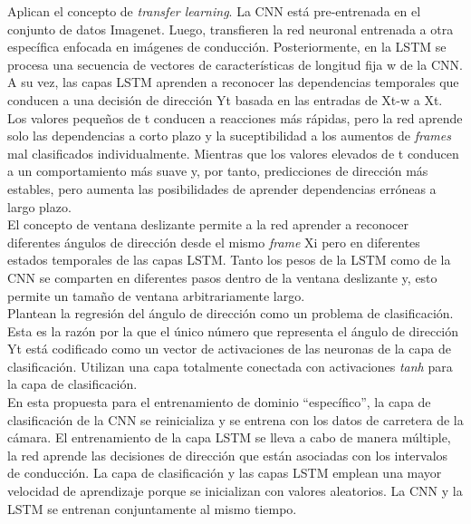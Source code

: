 Aplican el concepto de \textit{transfer learning}. La CNN está pre-entrenada en el conjunto de datos Imagenet. Luego, transfieren la red neuronal entrenada a otra específica enfocada en imágenes de conducción. Posteriormente, en la LSTM se procesa una secuencia de vectores de características de longitud fija w de la CNN. A su vez, las capas LSTM aprenden a reconocer las dependencias temporales que conducen a una decisión de dirección Yt basada en las entradas de Xt-w a Xt. Los valores pequeños de t conducen a reacciones más rápidas, pero la red aprende solo las dependencias a corto plazo y la suceptibilidad a los aumentos de \textit{frames} mal clasificados individualmente. Mientras que los valores elevados de t conducen a un comportamiento más suave y, por tanto, predicciones de dirección más estables, pero aumenta las posibilidades de aprender dependencias erróneas a largo plazo.\\

El concepto de ventana deslizante permite a la red aprender a reconocer diferentes ángulos de dirección desde el mismo \textit{frame} Xi pero en diferentes estados temporales de las capas LSTM. Tanto los pesos de la LSTM como de la CNN se comparten en diferentes pasos dentro de la ventana deslizante y, esto permite un tamaño de ventana arbitrariamente largo.\\

Plantean la regresión del ángulo de dirección como un problema de clasificación. Esta es la razón por la que el único número que representa el ángulo de dirección Yt está codificado como un vector de activaciones de las neuronas de la capa de clasificación. Utilizan una capa totalmente conectada con activaciones \textit{tanh} para la capa de clasificación.\\

En esta propuesta para el entrenamiento de dominio ``específico'', la capa de clasificación de la CNN se reinicializa y se entrena con los datos de carretera de la cámara. El entrenamiento de la capa LSTM se lleva a cabo de manera múltiple, la red aprende las decisiones de dirección que están asociadas con los intervalos de conducción. La capa de clasificación y las capas LSTM emplean una mayor velocidad de aprendizaje porque se inicializan con valores aleatorios. La CNN y la LSTM se entrenan conjuntamente al mismo tiempo.\\

